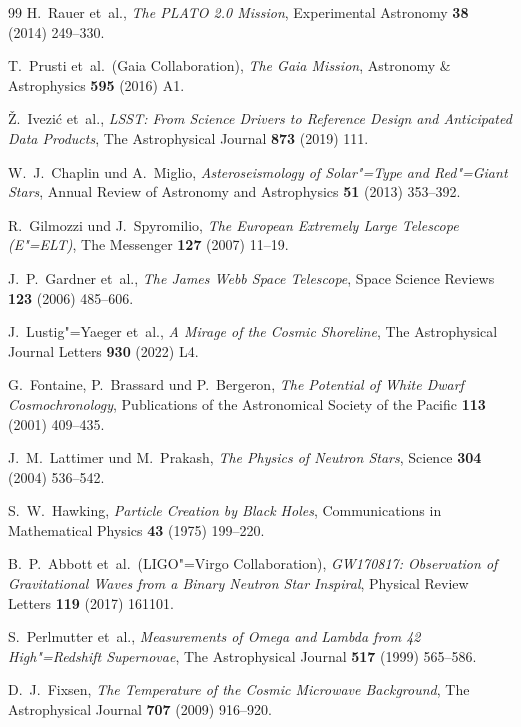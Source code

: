 ﻿\documentclass[a4paper,12pt]{article}
\theoremstyle{definition}
\begin{document}
\begin{thebibliography}{99}
H.~Rauer et~al.,
\textit{The PLATO 2.0 Mission},
Experimental Astronomy \textbf{38} (2014) 249--330.

T.~Prusti et~al.\ (Gaia Collaboration),
\textit{The Gaia Mission},
Astronomy \& Astrophysics \textbf{595} (2016) A1.

\v{Z}.~Ivezi\'c et~al.,
\textit{LSST: From Science Drivers to Reference Design and Anticipated
Data Products},
The Astrophysical Journal \textbf{873} (2019) 111.

W.~J.~Chaplin und A.~Miglio,
\textit{Asteroseismology of Solar"=Type and Red"=Giant Stars},
Annual Review of Astronomy and Astrophysics \textbf{51} (2013) 353--392.

R.~Gilmozzi und J.~Spyromilio,
\textit{The European Extremely Large Telescope (E"=ELT)},
The Messenger \textbf{127} (2007) 11--19.

J.~P.~Gardner et~al.,
\textit{The James Webb Space Telescope},
Space Science Reviews \textbf{123} (2006) 485--606.

J.~Lustig"=Yaeger et~al.,
\textit{A Mirage of the Cosmic Shoreline},
The Astrophysical Journal Letters \textbf{930} (2022) L4.

G.~Fontaine, P.~Brassard und P.~Bergeron,
\textit{The Potential of White Dwarf Cosmochronology},
Publications of the Astronomical Society of the Pacific
\textbf{113} (2001) 409--435.

J.~M.~Lattimer und M.~Prakash,
\textit{The Physics of Neutron Stars},
Science \textbf{304} (2004) 536--542.

S.~W.~Hawking,
\textit{Particle Creation by Black Holes},
Communications in Mathematical Physics \textbf{43} (1975) 199--220.

B.~P.~Abbott et~al.\ (LIGO"=Virgo Collaboration),
\textit{GW170817: Observation of Gravitational Waves from a Binary
Neutron Star Inspiral},
Physical Review Letters \textbf{119} (2017) 161101.

S.~Perlmutter et~al.,
\textit{Measurements of Omega and Lambda from 42 High"=Redshift Supernovae},
The Astrophysical Journal \textbf{517} (1999) 565--586.

D.~J.~Fixsen,
\textit{The Temperature of the Cosmic Microwave Background},
The Astrophysical Journal \textbf{707} (2009) 916--920.


\end{thebibliography}
\end{document}
